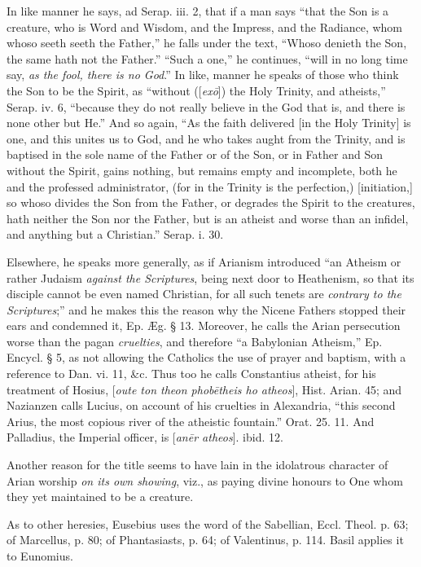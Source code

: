 In like manner he says, ad Serap. iii. 2, that if
a man says ``that the Son is a creature, who is Word and Wisdom, and
the Impress, and the Radiance, whom whoso seeth seeth the Father,'' he
falls under the text, ``Whoso denieth the Son, the same hath not the
Father.'' ``Such a one,'' he continues, ``will in no long time say, \emph{as
the fool, there is no God}.'' In like, manner he speaks of those who
think the Son to be the Spirit, as ``without ([\emph{ex\={o}}]) the
Holy Trinity, and atheists,'' Serap. iv. 6, ``because they do not
really believe in the God that is, and there is none other but He.''
And so again, ``As the faith delivered [in the Holy Trinity] is one,
and this unites us to God, and he who takes aught from the Trinity,
and is baptised in the sole name of the Father or of the Son, or in
Father and Son without the Spirit, gains nothing, but remains empty
and incomplete, both he and the professed administrator, (for in the
Trinity is the perfection,) [initiation,] so whoso divides the Son
from the Father, or degrades the Spirit to the creatures, hath neither
the Son nor the Father, but is an atheist and worse than an infidel,
and anything but a Christian.'' Serap. i. 30.

Elsewhere, he speaks more generally, as if
Arianism introduced ``an Atheism or rather Judaism \emph{against the
Scriptures}, being next door to Heathenism, so that its disciple
cannot be even named Christian, for all such tenets are \emph{contrary to
the Scriptures};'' and he makes this the reason why the Nicene
Fathers stopped their ears and condemned it, Ep. Æg. § 13. Moreover,
he calls the Arian persecution worse than the pagan \emph{cruelties},
and therefore ``a Babylonian Atheism,'' Ep. Encycl. § 5, as not
allowing the Catholics the use of prayer and baptism, with a reference
to Dan. vi. 11, \&c. Thus too he calls Constantius atheist, for his
treatment of Hosius, [\emph{oute ton theon phob\={e}theis ho atheos}],
Hist. Arian. 45; and Nazianzen calls Lucius, on account of his
cruelties in Alexandria, ``this second Arius, the most copious river of
the atheistic fountain.'' Orat. 25. 11. And Palladius, the Imperial
officer, is [\emph{an\={e}r atheos}]. ibid. 12.

Another reason for the title seems to have lain
in the idolatrous character of Arian worship \emph{on its own showing},
viz., as paying divine honours to One whom they yet maintained to be a
creature.

As to other heresies, Eusebius uses the word of
the Sabellian, Eccl. Theol. p. 63; of Marcellus, p. 80; of
Phantasiasts, p. 64; of Valentinus, p. 114. Basil applies it to
Eunomius.

